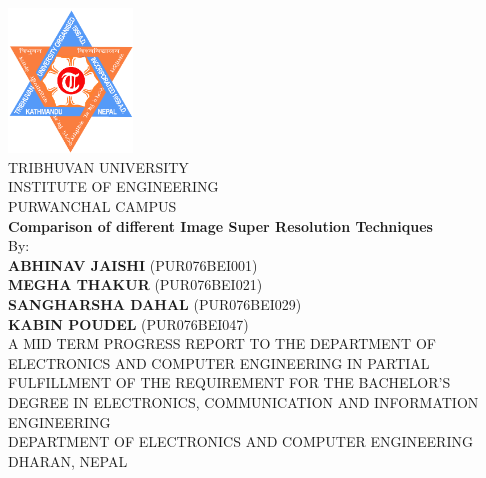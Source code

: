 
\thispagestyle{empty} %



{
	\thispagestyle{empty}
	\centering
	\normalsize
	  
	\includegraphics[width=1.3in]{./figures/TUlogo.png}\\
	{TRIBHUVAN UNIVERSITY}\\
	{INSTITUTE OF ENGINEERING}\\
	PURWANCHAL CAMPUS
	\\[1.5cm]
	
	{\bf Comparison of different Image Super Resolution Techniques}\\[1.5cm]
	
	By:\\
	{\bf ABHINAV JAISHI} (PUR076BEI001)\\
	{\bf MEGHA THAKUR} (PUR076BEI021)\\
	{\bf SANGHARSHA DAHAL} (PUR076BEI029)\\
	{\bf KABIN POUDEL} (PUR076BEI047)\\[1.5cm]
	


	A MID TERM PROGRESS REPORT TO THE DEPARTMENT OF ELECTRONICS AND COMPUTER
	ENGINEERING IN PARTIAL FULFILLMENT OF THE REQUIREMENT FOR THE BACHELOR'S
	DEGREE IN ELECTRONICS, COMMUNICATION AND INFORMATION ENGINEERING\\[1.5cm]
	
	DEPARTMENT OF ELECTRONICS AND COMPUTER ENGINEERING\\
	DHARAN, NEPAL\\[3.5cm]
	
	
}

